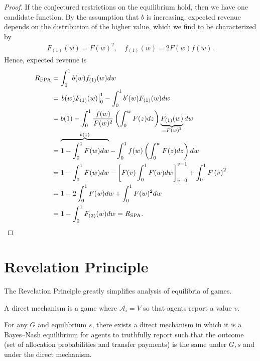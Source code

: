 \begin{proof}
	If the conjectured restrictions on the equilibrium hold, then we have one candidate function.
	By the assumption that $b$ is increasing, expected revenue depends on the distribution of the higher value, which we find to be characterized by 
	\begin{align*}
		F_{(1)}(w) = F(w)^2, \quad f_{(1)}(w) = 2F(w)f(w)
	.\end{align*}
	Hence, expected revenue is
	\begin{align*}
		R_{\text{FPA}}
		&= \int_{0}^{1} b(w) f_{(1)}(w)dw  \\
		&= \left. b(w) F_{(1)}(w) \right|_0^{1} - \int_{0}^{1} b'(w) F_{(1)}(w)dw \\
		&= b(1) - \int_{0}^{1} \frac{f(w)}{F(w)^2}\left( \int_{0}^{w} F(z)dz  \right)\underbrace{F_{(1)}(w)}_{\smash{=F(w)^2}}dw \\
		&= \overbrace{1-\int_{0}^{1} F(w)dw }^{\smash{b\left(1 \right)}} - \int_{0}^{1} f(w) \left( \int_{0}^{w} F(z)dz  \right)dw \\
		&= 1 - \int_{0}^{1} F(w)dw - \left[ F(v) \int_{0}^{1} F(w)dw  \right]_{v=0}^{v=1} + \int_{0}^{1} F\left( v \right)^2 \\
		&= 1- 2 \int_{0}^{1} F(w)dw + \int_{0}^{1} F(w)^2dw \\
		&=  1 - \int_{0}^{1} F_{(2)}(w)dw = R_{\text{SPA}}
	.\end{align*}
\end{proof}

\section{Revelation Principle}

The Revelation Principle greatly simplifies analysis of equilibria of games.

\begin{definition}
	A direct mechanism is a game where $\mathscr{A}_i = V$ so that agents report a value $v$.
\end{definition}

\begin{proposition}
	For any $G$ and equilibrium $s$, there exists a direct mechanism in which it is a Bayes--Nash equilibrium for agents to truthfully report such that the outcome (set of allocation probabilities and transfer payments) is the same under $G, s$ and under the direct mechanism.
\end{proposition}

